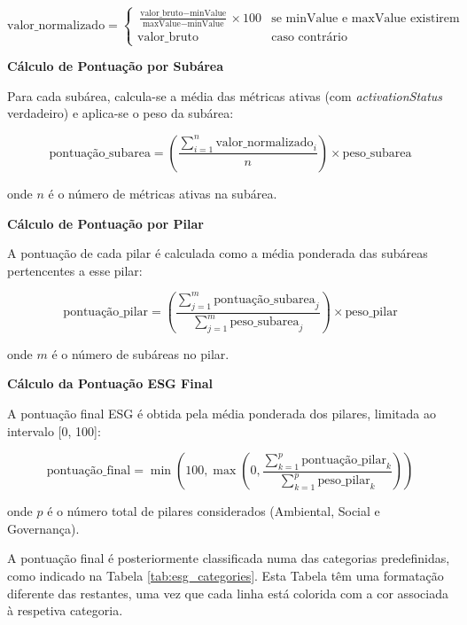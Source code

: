 \begin{equation}
    \text{valor\_normalizado} = \begin{cases}
        \frac{\text{valor\_bruto} - \text{minValue}}{\text{maxValue} - \text{minValue}} \times 100 & \text{se minValue e maxValue existirem} \\
        \text{valor\_bruto} & \text{caso contrário}
    \end{cases}
\end{equation}

\newpage

\textbf{Cálculo de Pontuação por Subárea}

Para cada subárea, calcula-se a média das métricas ativas (com \textit{activationStatus} verdadeiro) e aplica-se o peso da subárea:

\begin{equation}
    \text{pontuação\_subarea} = \left( \frac{\sum_{i=1}^{n} \text{valor\_normalizado}_i}{n} \right) \times \text{peso\_subarea}
\end{equation}

onde $n$ é o número de métricas ativas na subárea.

\textbf{Cálculo de Pontuação por Pilar}

A pontuação de cada pilar é calculada como a média ponderada das subáreas pertencentes a esse pilar:

\begin{equation}
    \text{pontuação\_pilar} = \left( \frac{\sum_{j=1}^{m} \text{pontuação\_subarea}_j}{\sum_{j=1}^{m} \text{peso\_subarea}_j} \right) \times \text{peso\_pilar}
\end{equation}

onde $m$ é o número de subáreas no pilar.

\textbf{Cálculo da Pontuação ESG Final}

A pontuação final ESG é obtida pela média ponderada dos pilares, limitada ao intervalo [0, 100]:

\begin{equation}
    \text{pontuação\_final} = \min\left(100, \max\left(0, \frac{\sum_{k=1}^{p} \text{pontuação\_pilar}_k}{\sum_{k=1}^{p} \text{peso\_pilar}_k}\right)\right)
\end{equation}

onde $p$ é o número total de pilares considerados (Ambiental, Social e Governança).

A pontuação final é posteriormente classificada numa das categorias predefinidas, como indicado na Tabela \ref{tab:esg_categories}. Esta Tabela têm uma formatação diferente das restantes, uma vez que cada linha está colorida com a cor associada à respetiva categoria.


